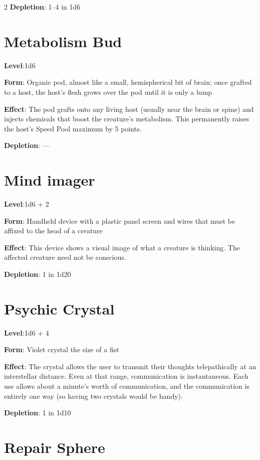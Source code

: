 \begin{multicols}{2}
\textbf{Depletion}: 1–4 in 1d6

\section{Metabolism Bud}

\textbf{Level}:1d6

\textbf{Form}: Organic pod, almost like a small, hemispherical bit of brain; once grafted to a host, the host’s flesh grows over the pod until it is only a lump

\textbf{Effect}: The pod grafts onto any living host (usually near the brain or spine) and injects chemicals that boost the creature’s metabolism. This permanently raises the host’s Speed Pool maximum by 5 points.

\textbf{Depletion}: —

\section{Mind imager}

\textbf{Level}:1d6 + 2

\textbf{Form}: Handheld device with a plastic panel screen and wires that must be affixed to the head of a creature

\textbf{Effect}: This device shows a visual image of what a creature is thinking. The affected creature need not be conscious.

\textbf{Depletion}: 1 in 1d20

\section{Psychic Crystal}

\textbf{Level}:1d6 + 4

\textbf{Form}: Violet crystal the size of a fist

\textbf{Effect}: The crystal allows the user to transmit their thoughts telepathically at an interstellar distance. Even at that range, communication is instantaneous. Each use allows about a minute’s worth of communication, and the communication is entirely one way (so having two crystals would be handy).

\textbf{Depletion}: 1 in 1d10

\section{Repair Sphere}


\end{multicols}
